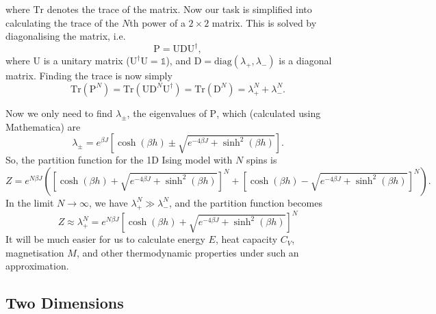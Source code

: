 \documentclass[11pt]{article}
\newcommand{\bmat}[1]{\bm{\mathrm{#1}}}
\begin{document}
	where $\mathrm{Tr}$ denotes the trace of the matrix. Now our task is simplified into calculating the trace of the $N$th power of a $2 \times 2$ matrix. This is solved by diagonalising the matrix, i.e.
	\begin{equation} \label{eq:MatrixPDiagonal}
		\bmat{P} = \bmat{U}\bmat{D}\bmat{U}^\dagger,
	\end{equation}
	where $\bmat{U}$ is a unitary matrix ($\bmat{U}^\dagger \bmat{U} = \mathds{1}$), and $\bmat{D} = \mathrm{diag}(\lambda_+, \lambda_-)$ is a diagonal matrix. Finding the trace is now simply
	\begin{equation} \label{eq:MatrixPNTrace}
		\mathrm{Tr}(\bmat{P}^N) = \mathrm{Tr}(\bmat{U}\bmat{D}^N \bmat{U}^\dagger) = \mathrm{Tr}(\bmat{D}^N) = \lambda_+^N + \lambda_-^N.
	\end{equation}

	Now we only need to find $\lambda_\pm$, the eigenvalues of $\bmat{P}$, which (calculated using Mathematica) are
	\begin{equation} \label{eq:MatrixPEigenvalues}
		\lambda_\pm = e^{\beta J} \left[\cosh(\beta h) \pm \sqrt{e^{-4\beta J}+\sinh^2(\beta h)}\right].
	\end{equation}
	So, the partition function for the 1D Ising model with $N$ spins is
	\begin{equation}\label{eq:PartitionFunction1DGeneralFinal}
		Z = e^{N \beta J} \left(\left[\cosh(\beta h) + \sqrt{e^{-4\beta J}+\sinh^2(\beta h)}\right]^N
		+ \left[\cosh(\beta h) - \sqrt{e^{-4\beta J}+\sinh^2(\beta h)}\right]^N\right).
	\end{equation}
	In the limit $N \to \infty$, we have $\lambda_+^N \gg \lambda_-^N$, and the partition function becomes
		\begin{equation} \label{eq:PartitionFunction1DGeneralLimit}
			Z \approx \lambda_+^N = e^{N \beta J} \left[\cosh(\beta h) + \sqrt{e^{-4\beta J}+\sinh^2(\beta h)}\right]^N
		\end{equation}
	It will be much easier for us to calculate energy $E$, heat capacity $C_V$, magnetisation $M$, and other thermodynamic properties under such an approximation.

	\subsection{Two Dimensions}
	
\end{document}
